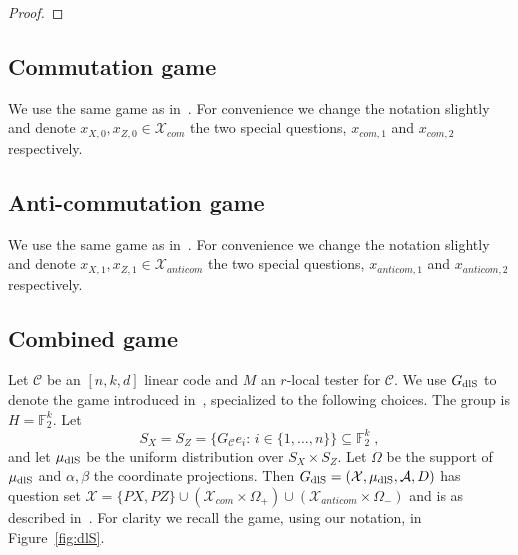\documentclass[11pt]{article}
\theoremstyle{definition}
\newcommand{\code}{\mathcal{C}}
\DeclareMathOperator*{\Expectation}{\mathbb{E}}
\newcommand{\Es}[1]{\Expectation_{#1}}
\newcommand{\field}{\mathbb{F}_2}
\newcommand{\dlS}{\ensuremath{\rm dlS}}
\newcommand{\mA}{\ensuremath{\mathcal{A}}}
\newcommand{\mM}{\ensuremath{\mathcal{M}}}
\newcommand{\mX}{\ensuremath{\mathcal{X}}}
\newcommand{\mN}{\mathcal{N}}
\begin{document}
\begin{proof}
\end{proof}


\subsection{Commutation game}

We use the same game as in~\cite[Section 3.1]{de2022spectral}. For convenience we change the notation slightly and denote $x_{X,0}, x_{Z,0} \in \mX_{com}$ the two special questions, $x_{com,1}$ and $x_{com,2}$ respectively. 

\subsection{Anti-commutation game}

We use the same game as in~\cite[Section 3.2]{de2022spectral}. For convenience we change the notation slightly and  denote $x_{X,1}, x_{Z,1} \in \mX_{anticom}$ the two special questions, $x_{anticom,1}$ and $x_{anticom,2}$ respectively. 

\subsection{Combined game}

Let $\code$ be an $[n,k,d]$ linear code and $M$ an $r$-local tester for $\code$. 
We use $G_{\dlS}$ to denote the game introduced in~\cite[Section 3.4]{de2022spectral}, specialized to the following choices. The group is $H=\field^k$. Let
\[ S_X=S_Z=\{G_\code e_i:\,i\in\{1,\ldots,n\}\}\subseteq \field^k\;,\]
and let $\mu_{\dlS}$ be the uniform distribution over $S_X\times S_Z$. Let $\Omega$ be the support of $\mu_{\dlS}$ and $\alpha,\beta$ the coordinate projections. Then $G_{\dlS}=(\mX,\mu_{\dlS},\mA,D)$ has question set $\mX = \{PX,PZ\} \cup (\mX_{com}\times \Omega_+) \cup (\mX_{anticom} \times \Omega_-)$ and is as described in~\cite[Section 3.4]{de2022spectral}. For clarity we recall the game, using our notation, in Figure~\ref{fig:dlS}. 
\end{document}
